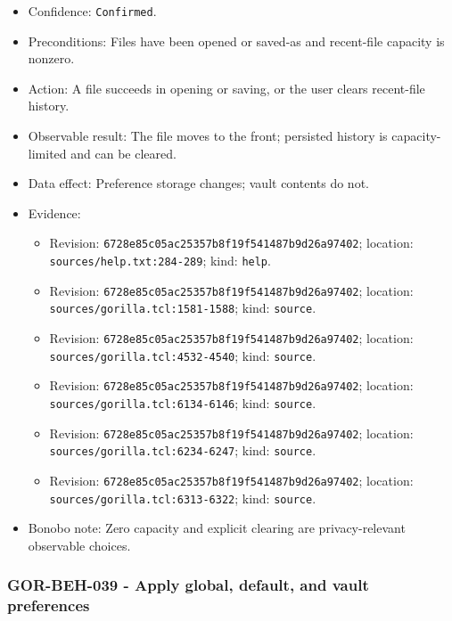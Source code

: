 \documentclass[
  letterpaper,
]{article}
\newcommand{\passthrough}[1]{#1}
\providecommand{\tightlist}{%
  \setlength{\itemsep}{0pt}\setlength{\parskip}{0pt}}
\begin{document}
\begin{itemize}
\tightlist
\item
  Confidence: \passthrough{\lstinline!Confirmed!}.
\item
  Preconditions: Files have been opened or saved-as and recent-file capacity is nonzero.
\item
  Action: A file succeeds in opening or saving, or the user clears recent-file history.
\item
  Observable result: The file moves to the front; persisted history is capacity-limited and can be cleared.
\item
  Data effect: Preference storage changes; vault contents do not.
\item
  Evidence:

  \begin{itemize}
  \tightlist
  \item
    Revision: \nolinkurl{6728e85c05ac25357b8f19f541487b9d26a97402}; location: \nolinkurl{sources/help.txt:284-289};
    kind: \passthrough{\lstinline!help!}.
  \item
    Revision: \nolinkurl{6728e85c05ac25357b8f19f541487b9d26a97402}; location: \nolinkurl{sources/gorilla.tcl:1581-1588};
    kind: \passthrough{\lstinline!source!}.
  \item
    Revision: \nolinkurl{6728e85c05ac25357b8f19f541487b9d26a97402}; location: \nolinkurl{sources/gorilla.tcl:4532-4540};
    kind: \passthrough{\lstinline!source!}.
  \item
    Revision: \nolinkurl{6728e85c05ac25357b8f19f541487b9d26a97402}; location: \nolinkurl{sources/gorilla.tcl:6134-6146};
    kind: \passthrough{\lstinline!source!}.
  \item
    Revision: \nolinkurl{6728e85c05ac25357b8f19f541487b9d26a97402}; location: \nolinkurl{sources/gorilla.tcl:6234-6247};
    kind: \passthrough{\lstinline!source!}.
  \item
    Revision: \nolinkurl{6728e85c05ac25357b8f19f541487b9d26a97402}; location: \nolinkurl{sources/gorilla.tcl:6313-6322};
    kind: \passthrough{\lstinline!source!}.
  \end{itemize}
\item
  Bonobo note: Zero capacity and explicit clearing are privacy-relevant observable choices.
\end{itemize}

\subsubsection{GOR-BEH-039 - Apply global, default, and vault
preferences}\label{gor-beh-039---apply-global-default-and-vault-preferences}
\end{document}
